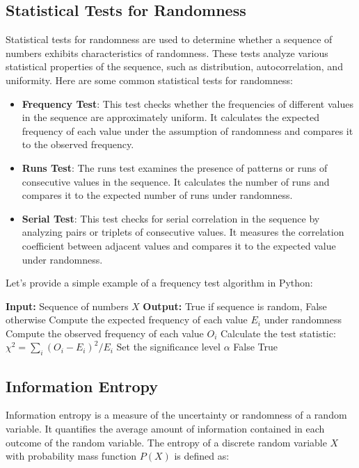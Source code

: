 \documentclass[12pt]{book} %
\begin{document}
\subsection{Statistical Tests for Randomness}
Statistical tests for randomness are used to determine whether a sequence of numbers exhibits characteristics of randomness. These tests analyze various statistical properties of the sequence, such as distribution, autocorrelation, and uniformity. Here are some common statistical tests for randomness:

\begin{itemize}
    \item \textbf{Frequency Test}: This test checks whether the frequencies of different values in the sequence are approximately uniform. It calculates the expected frequency of each value under the assumption of randomness and compares it to the observed frequency.
    
    \item \textbf{Runs Test}: The runs test examines the presence of patterns or runs of consecutive values in the sequence. It calculates the number of runs and compares it to the expected number of runs under randomness.
    
    \item \textbf{Serial Test}: This test checks for serial correlation in the sequence by analyzing pairs or triplets of consecutive values. It measures the correlation coefficient between adjacent values and compares it to the expected value under randomness.
\end{itemize}

Let's provide a simple example of a frequency test algorithm in Python:
\FloatBarrier
\begin{algorithm}
\caption{Frequency Test Algorithm}\label{freq_test}
\begin{algorithmic}[1]
\State \textbf{Input:} Sequence of numbers $X$
\State \textbf{Output:} True if sequence is random, False otherwise
\State Compute the expected frequency of each value $E_i$ under randomness
\State Compute the observed frequency of each value $O_i$
\State Calculate the test statistic: $\chi^2 = \sum_{i}(O_i - E_i)^2 / E_i$
\State Set the significance level $\alpha$
    \Return False
\Else
    \Return True
\EndIf
\end{algorithmic}
\end{algorithm}
\FloatBarrier

\subsection{Information Entropy}
Information entropy is a measure of the uncertainty or randomness of a random variable. It quantifies the average amount of information contained in each outcome of the random variable. The entropy of a discrete random variable $X$ with probability mass function $P(X)$ is defined as:
\end{document}
